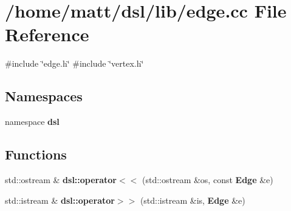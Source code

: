 \section{/home/matt/dsl/lib/edge.cc \-File \-Reference}
\label{edge_8cc}
{\ttfamily \#include \char`\"{}edge.\-h\char`\"{}}\*
{\ttfamily \#include \char`\"{}vertex.\-h\char`\"{}}\*
\subsection*{\-Namespaces}
\begin{DoxyCompactItemize}
\item 
namespace {\bf dsl}
\end{DoxyCompactItemize}
\subsection*{\-Functions}
\begin{DoxyCompactItemize}
\item 
std\-::ostream \& {\bf dsl\-::operator$<$$<$} (std\-::ostream \&os, const {\bf \-Edge} \&e)
\item 
std\-::istream \& {\bf dsl\-::operator$>$$>$} (std\-::istream \&is, {\bf \-Edge} \&e)
\end{DoxyCompactItemize}
